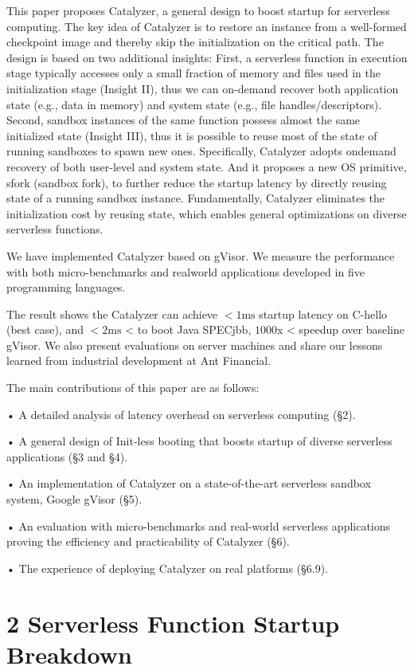 \documentclass[
  10
]{article}
\begin{document}
This paper proposes Catalyzer, a general design to boost startup for
serverless computing. The key idea of Catalyzer is to restore an
instance from a well-formed checkpoint image and thereby skip the
initialization on the critical path. The design is based on two
additional insights: First, a serverless function in execution stage
typically accesses only a small fraction of memory and files used in the
initialization stage (Insight II), thus we can on-demand recover both
application state (e.g., data in memory) and system state (e.g., file
handles/descriptors). Second, sandbox instances of the same function
possess almost the same initialized state (Insight III), thus it is
possible to reuse most of the state of running sandboxes to spawn new
ones. Specifically, Catalyzer adopts ondemand recovery of both
user-level and system state. And it proposes a new OS primitive, sfork
(sandbox fork), to further reduce the startup latency by directly
reusing state of a running sandbox instance. Fundamentally, Catalyzer
eliminates the initialization cost by reusing state, which enables
general optimizations on diverse serverless functions.

We have implemented Catalyzer based on gVisor. We measure the
performance with both micro-benchmarks and realworld applications
developed in five programming languages.

The result shows the Catalyzer can achieve \({ < } 1 \mathrm { m s }\)
startup latency on C-hello (best case), and \(< 2 \mathrm { m s }\)
\textless{} to boot Java SPECjbb, \(1 0 0 0 \mathrm { x }\) \textless{}
speedup over baseline gVisor. We also present evaluations on server
machines and share our lessons learned from industrial development at
Ant Financial.

The main contributions of this paper are as follows:

• A detailed analysis of latency overhead on serverless computing (§2).

• A general design of Init-less booting that boosts startup of diverse
serverless applications (§3 and §4).

• An implementation of Catalyzer on a state-of-the-art serverless
sandbox system, Google gVisor (§5).

• An evaluation with micro-benchmarks and real-world serverless
applications proving the efficiency and practicability of Catalyzer
(§6).

• The experience of deploying Catalyzer on real platforms (§6.9).

\section{2 Serverless Function Startup
Breakdown}\label{serverless-function-startup-breakdown}
\end{document}
